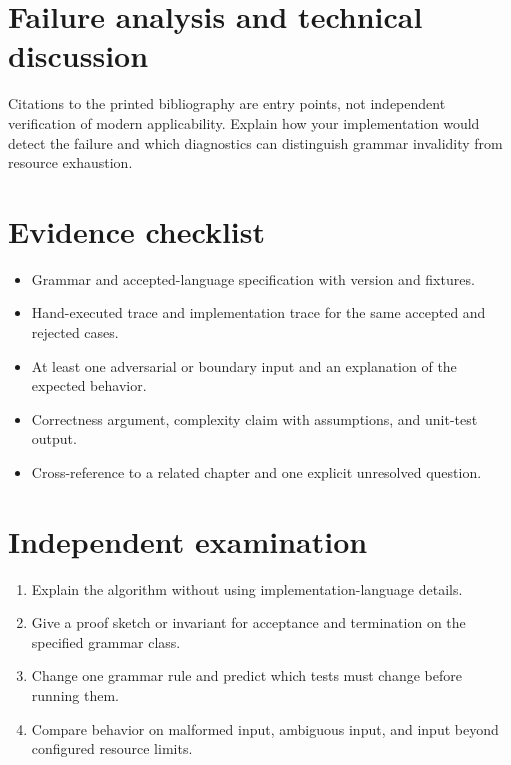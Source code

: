 \documentclass[11pt,letterpaper]{article}
\begin{document}
\section{Failure analysis and technical discussion}
Citations to the printed bibliography are entry points, not independent verification of modern applicability. Explain how your implementation would detect the failure and which diagnostics can distinguish grammar invalidity from resource exhaustion.
\section{Evidence checklist}
\begin{itemize}
\item Grammar and accepted-language specification with version and fixtures.
\item Hand-executed trace and implementation trace for the same accepted and rejected cases.
\item At least one adversarial or boundary input and an explanation of the expected behavior.
\item Correctness argument, complexity claim with assumptions, and unit-test output.
\item Cross-reference to a related chapter and one explicit unresolved question.
\end{itemize}
\section{Independent examination}
\begin{enumerate}
\item Explain the algorithm without using implementation-language details.
\item Give a proof sketch or invariant for acceptance and termination on the specified grammar class.
\item Change one grammar rule and predict which tests must change before running them.
\item Compare behavior on malformed input, ambiguous input, and input beyond configured resource limits.
\end{enumerate}
\end{document}
